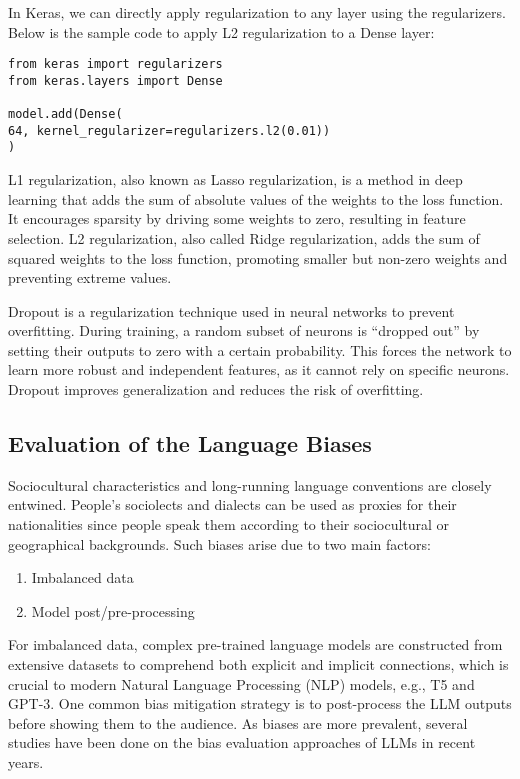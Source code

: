 In Keras, we can directly apply regularization to any layer using the regularizers. Below is the sample code to apply L2 regularization to a Dense layer:
\begin{verbatim}
from keras import regularizers
from keras.layers import Dense

model.add(Dense(
64, kernel_regularizer=regularizers.l2(0.01))
)
\end{verbatim}

L1 regularization, also known as Lasso regularization, is a method in deep learning that adds the sum of absolute values of the weights to the loss function. It encourages sparsity by driving some weights to zero, resulting in feature selection. L2 regularization, also called Ridge regularization, adds the sum of squared weights to the loss function, promoting smaller but non-zero weights and preventing extreme values.

Dropout is a regularization technique used in neural networks to prevent overfitting. During training, a random subset of neurons is “dropped out” by setting their outputs to zero with a certain probability. This forces the network to learn more robust and independent features, as it cannot rely on specific neurons. Dropout improves generalization and reduces the risk of overfitting.

\subsection{Evaluation of the Language Biases}

Sociocultural characteristics and long-running language conventions are closely entwined. People’s sociolects and dialects can be used as proxies for their nationalities since people speak them according to their sociocultural or geographical backgrounds. Such biases\cite{Wasi2024BengaliBiases} arise due to two main factors:
\begin{enumerate}
    \item Imbalanced data
    \item Model post/pre-processing
\end{enumerate}

For imbalanced data, complex pre-trained language models are constructed from extensive datasets to comprehend both explicit and implicit connections, which is crucial to modern Natural Language Processing (NLP) models, e.g., T5 and GPT-3. One common bias mitigation strategy is to post-process the LLM outputs before showing them to the audience. As biases are more prevalent, several studies have been done on the bias evaluation approaches of LLMs in recent years.

